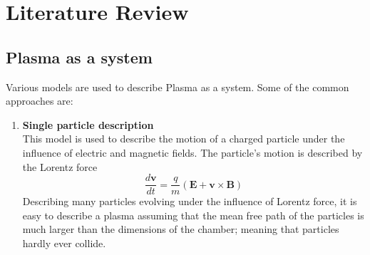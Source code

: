 \documentclass[12pt]{article}
\begin{document}
	\section{Literature Review}
	
	\subsection{Plasma as a system}
	Various models are used to describe Plasma as a system. Some of the common approaches are:
	\begin{enumerate}
		\item \textbf{Single particle description} \\
		This model is used to describe the motion of a charged particle under the influence of electric and magnetic fields. The particle's motion is described by the Lorentz force 
		\begin{equation}
			\label{eqn:lorentz}
			\frac{d \textbf{$\boldsymbol{v}$}}{d t} = \frac{q}{m} \left(\textbf{$\mathbf{E}$} + \textbf{$\boldsymbol{v}$} \times \textbf{$\mathbf{B}$} \right)
		\end{equation}
		Describing many particles evolving under the influence of Lorentz force, it is easy to describe a plasma assuming that the mean free path of the particles is much larger than the dimensions of the chamber; meaning that particles hardly ever collide.
	

\end{enumerate}
\end{document}
